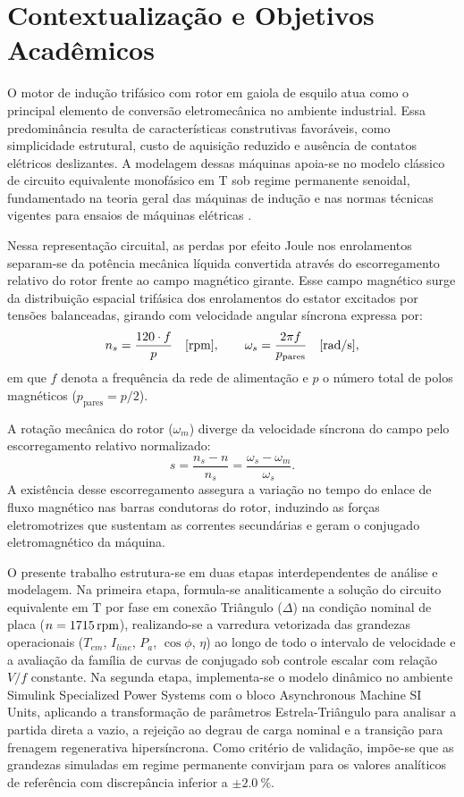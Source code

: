 \section{Contextualização e Objetivos Acadêmicos}\label{sec:contexto_objetivos}

O motor de indução trifásico com rotor em gaiola de esquilo atua como o principal elemento de conversão eletromecânica no ambiente industrial. Essa predominância resulta de características construtivas favoráveis, como simplicidade estrutural, custo de aquisição reduzido e ausência de contatos elétricos deslizantes. A modelagem dessas máquinas apoia-se no modelo clássico de circuito equivalente monofásico em T sob regime permanente senoidal, fundamentado na teoria geral das máquinas de indução e nas normas técnicas vigentes para ensaios de máquinas elétricas \cite{fitzgerald2014maquinas,chapman2013fundamentos}.

Nessa representação circuital, as perdas por efeito Joule nos enrolamentos separam-se da potência mecânica líquida convertida através do escorregamento relativo do rotor frente ao campo magnético girante. Esse campo magnético surge da distribuição espacial trifásica dos enrolamentos do estator excitados por tensões balanceadas, girando com velocidade angular síncrona expressa por:
\begin{equation}
n_s = \frac{120 \cdot f}{p} \quad [\mathrm{rpm}], \qquad \omega_s = \frac{2\pi f}{p_{\text{pares}}} \quad [\mathrm{rad/s}],
\label{eq:velocidade_sincrona}
\end{equation}
em que $f$ denota a frequência da rede de alimentação e $p$ o número total de polos magnéticos ($p_{\text{pares}} = p/2$).

A rotação mecânica do rotor ($\omega_m$) diverge da velocidade síncrona do campo pelo escorregamento relativo normalizado:
\begin{equation}
s = \frac{n_s - n}{n_s} = \frac{\omega_s - \omega_m}{\omega_s}.
\label{eq:escorregamento}
\end{equation}
A existência desse escorregamento assegura a variação no tempo do enlace de fluxo magnético nas barras condutoras do rotor, induzindo as forças eletromotrizes que sustentam as correntes secundárias e geram o conjugado eletromagnético da máquina.

O presente trabalho estrutura-se em duas etapas interdependentes de análise e modelagem. Na primeira etapa, formula-se analiticamente a solução do circuito equivalente em T por fase em conexão Triângulo ($\Delta$) na condição nominal de placa ($n = \SI{1715}{\mathrm{rpm}}$), realizando-se a varredura vetorizada das grandezas operacionais ($T_{em}$, $I_{line}$, $P_a$, $\cos\phi$, $\eta$) ao longo de todo o intervalo de velocidade e a avaliação da família de curvas de conjugado sob controle escalar com relação $V/f$ constante. Na segunda etapa, implementa-se o modelo dinâmico no ambiente Simulink Specialized Power Systems com o bloco Asynchronous Machine SI Units, aplicando a transformação de parâmetros Estrela-Triângulo para analisar a partida direta a vazio, a rejeição ao degrau de carga nominal e a transição para frenagem regenerativa hipersíncrona. Como critério de validação, impõe-se que as grandezas simuladas em regime permanente convirjam para os valores analíticos de referência com discrepância inferior a $\pm \SI{2,0}{\percent}$.
